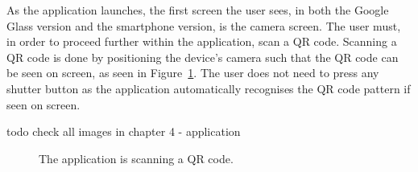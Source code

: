As the application launches, the first screen the user sees, in both the Google Glass version and the smartphone version, is the camera screen. The user must, in order to proceed further within the application, scan a QR code. Scanning a QR code is done by positioning the device's camera such that the QR code can be seen on screen, as seen in Figure~\ref{glassDemoQR}. The user does not need to press any shutter button as the application automatically recognises the QR code pattern if seen on screen.%

todo check all images in chapter 4 - application

	
	\begin{figure}[ht!]
		\centering
   		 \qquad
   		 \qquad
		\caption{The application is scanning a QR code.}
		\label{glassDemoQR}
	\end{figure}

